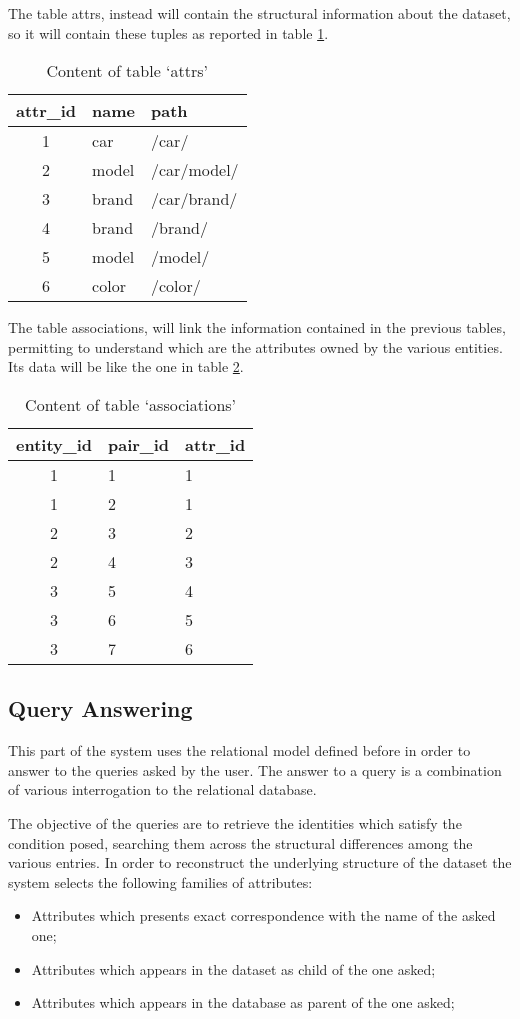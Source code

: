 \documentclass{acm_proc_article-sp-sigmod07}
\begin{document}
The table attrs, instead will contain the structural information
about the dataset, so it will contain these tuples as reported in table
\ref{tabat1}.

\begin{table}
\begin{tabular}{|c|l|l|}
\hline
attr\_id & name & path \\
\hline
1 & car   & /car/ \\
2 & model & /car/model/ \\
3 & brand & /car/brand/ \\
4 & brand & /brand/ \\
5 & model & /model/ \\
6 & color & /color/ \\ 
\hline
\end{tabular}
\caption{Content of table `attrs'}
\label{tabat1}
\end{table}

The table associations, will link the information contained in the
previous tables, permitting to understand which are the attributes owned
by the various entities. Its data will be like the one in table
\ref{tabas1}.

\begin{table}
\begin{tabular}{|c|l|l|}
\hline
entity\_id & pair\_id & attr\_id \\
\hline
1 & 1 & 1 \\
1 & 2 & 1 \\
2 & 3 & 2 \\
2 & 4 & 3 \\
3 & 5 & 4 \\
3 & 6 & 5 \\
3 & 7 & 6 \\
\hline
\end{tabular}
\caption{Content of table `associations'}
\label{tabas1}
\end{table}

\subsection{Query Answering}
This part of the system uses the relational model defined before in order
to answer to the queries asked by the user.
The answer to a query is a combination of various interrogation to the
relational database.

The objective of the queries are to retrieve the identities which satisfy
the condition posed, searching them across the structural differences
among the various entries.
In order to reconstruct the underlying structure of the dataset the system
selects the following families of attributes:
\begin{itemize}
\item Attributes which presents exact correspondence with the name of the
asked one;
\item Attributes which appears in the dataset as child of the one asked;
\item Attributes which appears in the database as parent of the one asked;
\end{itemize}
\end{document}
